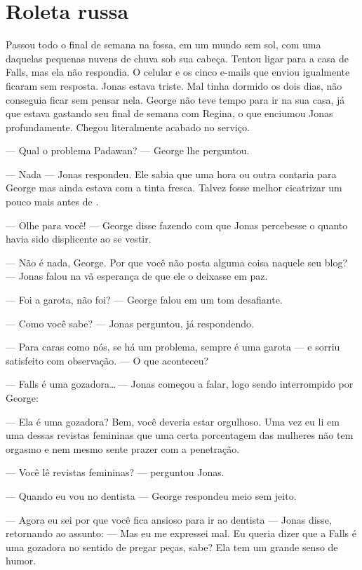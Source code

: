 \chapter{Roleta russa}

Passou todo o final de semana na fossa, em um mundo sem sol, com uma daquelas pequenas nuvens de chuva sob sua cabeça. Tentou ligar para a casa de Falls, mas ela não respondia. O celular e os cinco e-mails que enviou igualmente ficaram sem resposta. Jonas estava triste. Mal tinha dormido os dois dias, não conseguia ficar sem pensar nela. George não teve tempo para ir na sua casa, já que estava gastando seu final de semana com Regina, o que enciumou Jonas profundamente. Chegou literalmente acabado no serviço.

--- Qual o problema\mudanca{,} Padawan? --- George lhe perguntou.

--- Nada --- Jonas respondeu. Ele sabia que uma hora ou outra contaria para George\mudanca{,} mas ainda estava com a tinta fresca. Talvez fosse melhor  cicatrizar um pouco mais antes de .

--- Olhe para você! --- George disse\mudanca{,} fazendo com que Jonas percebesse o quanto havia sido displicente ao se vestir.

--- Não é nada, George. Por que você não posta alguma coisa naquele seu blog? --- Jonas falou\mudanca{,} na vã esperança de que ele o deixasse em paz.

--- Foi a garota, não foi? --- George falou\mudanca{,} em um tom desafiante.

--- Como você sabe? --- Jonas perguntou, já respondendo.

--- Para caras como nós, se há um problema, sempre é uma garota --- e sorriu satisfeito com  observação. --- O que aconteceu?

--- Falls é uma gozadora\ldots\,--- Jonas começou a falar, logo sendo interrompido por George:

--- Ela é uma gozadora? Bem, você deveria estar orgulhoso. Uma vez eu li em uma dessas revistas femininas que uma certa porcentagem das mulheres não tem orgasmo e nem mesmo sente prazer com a penetração.

--- Você lê revistas femininas? --- perguntou Jonas.

--- Quando eu vou no dentista --- George respondeu\mudanca{,} meio sem jeito.

--- Agora eu sei por que você fica ansioso para ir ao dentista --- Jonas disse, retornando ao assunto: --- Mas eu me expressei mal. Eu queria dizer que a Falls é uma gozadora no sentido de pregar peças, sabe? Ela tem um grande senso de humor.

